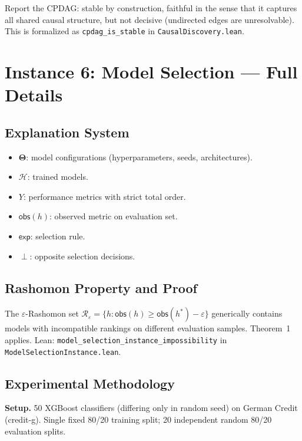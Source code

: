 \documentclass{article}
\newcommand{\Params}{\mathbf{\Theta}}
\newcommand{\sH}{\mathcal{H}}
\newcommand{\incomp}{\perp}
\begin{document}
Report the CPDAG: stable by construction, faithful in the sense that it captures all shared causal structure, but not decisive (undirected edges are unresolvable).  This is formalized as \texttt{cpdag\_is\_stable} in \texttt{CausalDiscovery.lean}.

\section{Instance 6: Model Selection --- Full Details}
\label{sec:ms-full}

\subsection{Explanation System}

\begin{itemize}
  \item $\Params$: model configurations (hyperparameters, seeds, architectures).
  \item $\sH$: trained models.
  \item $Y$: performance metrics with strict total order.
  \item $\mathsf{obs}(h)$: observed metric on evaluation set.
  \item $\mathsf{exp}$: selection rule.
  \item $\incomp$: opposite selection decisions.
\end{itemize}

\subsection{Rashomon Property and Proof}

The $\varepsilon$-Rashomon set $\mathcal{R}_\varepsilon = \{h : \mathsf{obs}(h) \geq \mathsf{obs}(h^*) - \varepsilon\}$ generically contains models with incompatible rankings on different evaluation samples.  Theorem~1 applies.  Lean: \texttt{model\_selection\_instance\_impossibility} in \texttt{ModelSelectionInstance.lean}.

\subsection{Experimental Methodology}

\textbf{Setup.}  50 XGBoost classifiers (differing only in random seed) on German Credit (credit-g).  Single fixed 80/20 training split; 20 independent random 80/20 evaluation splits.
\end{document}

